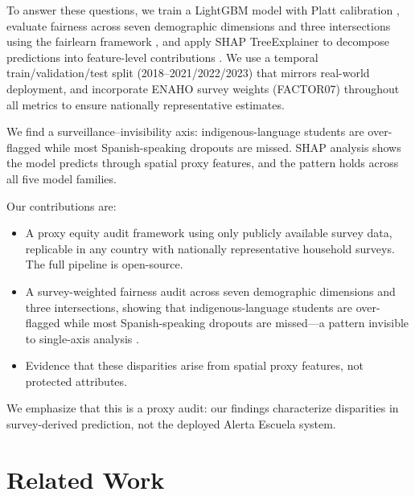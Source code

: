 \documentclass[notitlepage,12pt]{jedm}
\begin{document}
To answer these questions, we train a LightGBM model with Platt calibration \cite{ke2017lightgbm,platt1999probabilistic}, evaluate fairness across seven demographic dimensions and three intersections using the fairlearn framework \cite{bird2020fairlearn}, and apply SHAP TreeExplainer to decompose predictions into feature-level contributions \cite{lundberg2017unified}. We use a temporal train/validation/test split (2018--2021/2022/2023) that mirrors real-world deployment, and incorporate ENAHO survey weights (FACTOR07) throughout all metrics to ensure nationally representative estimates.

We find a surveillance--invisibility axis: indigenous-language students are over-flagged while most Spanish-speaking dropouts are missed. SHAP analysis shows the model predicts through spatial proxy features, and the pattern holds across all five model families.

Our contributions are:
\begin{itemize}
  \item A proxy equity audit framework using only publicly available survey data, replicable in any country with nationally representative household surveys. The full pipeline is open-source.
  \item A survey-weighted fairness audit across seven demographic dimensions and three intersections, showing that indigenous-language students are over-flagged while most Spanish-speaking dropouts are missed---a pattern invisible to single-axis analysis \cite{crenshaw1989demarginalizing,buolamwini2018gender}.
  \item Evidence that these disparities arise from spatial proxy features, not protected attributes.
\end{itemize}

We emphasize that this is a proxy audit: our findings characterize disparities in survey-derived prediction, not the deployed Alerta Escuela system.

\section{Related Work}
\end{document}
